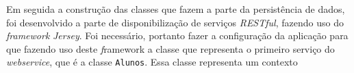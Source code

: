 			\par Em seguida a construção das classes que fazem a parte da persistência de
		dados, foi desenvolvido a parte de disponibilização de serviços
		\textit{RESTful}, fazendo uso do \textit{framework} \textit{Jersey}. Foi
		necessário, portanto fazer a configuração da aplicação para que fazendo uso
		deste \textit framework a classe que representa o primeiro serviço do
		\textit{webservice}, que é a classe \texttt{Alunos}. Essa classe representa um contexto
		
		
